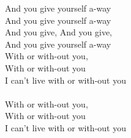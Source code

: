 And you  give yourself a-way\\
And you  give yourself a-way\\
And you  give, And you  give,\\
And you  give yourself a-way\\
With or with-out you,\\
With or with-out you \\
I can't  live  with or with-out you   \\
            \\
With or with-out you,\\
With or with-out you \\
I can't  live  with or with-out you   
